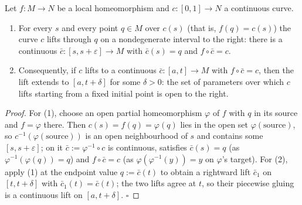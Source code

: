 \begin{lemma}
  \label{lem:dc-ch7-3-3-local-lift}
  \leanok
  Let $f:M\to N$ be a local homeomorphism and $c:[0,1]\to N$ a continuous curve.
  \begin{enumerate}
    \item For every $s$ and every point $q\in M$ over $c(s)$ (that is,
      $f(q)=c(s)$) the curve $c$ lifts through $q$ on a nondegenerate interval to
      the right: there is a continuous $\bar c:[s,s+\varepsilon]\to M$ with
      $\bar c(s)=q$ and $f\circ\bar c=c$.
    \item Consequently, if $c$ lifts to a continuous $\bar c:[a,t]\to M$ with
      $f\circ\bar c=c$, then the lift extends to $[a,t+\delta]$ for some
      $\delta>0$: the set of parameters over which $c$ lifts starting from a fixed
      initial point is open to the right.
  \end{enumerate}
\end{lemma}
\begin{proof}
  \leanok
  For (1), choose an open partial homeomorphism $\varphi$ of $f$ with $q$ in its
  source and $f=\varphi$ there. Then $c(s)=f(q)=\varphi(q)$ lies in the open set
  $\varphi(\text{source})$, so $c^{-1}(\varphi(\text{source}))$ is an open
  neighbourhood of $s$ and contains some $[s,s+\varepsilon]$; on it
  $\bar c:=\varphi^{-1}\circ c$ is continuous, satisfies $\bar c(s)=q$ (as
  $\varphi^{-1}(\varphi(q))=q$) and $f\circ\bar c=c$ (as
  $\varphi(\varphi^{-1}(y))=y$ on $\varphi$'s target).
  For (2), apply (1) at the endpoint value $q:=\bar c(t)$ to obtain a rightward
  lift $\bar c_1$ on $[t,t+\delta]$ with $\bar c_1(t)=\bar c(t)$; the two lifts
  agree at $t$, so their piecewise gluing is a continuous lift on
  $[a,t+\delta]$. $\square$
\end{proof}


